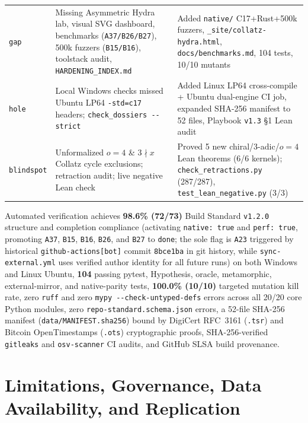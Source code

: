 \documentclass[11pt,reqno]{amsart}
\theoremstyle{plain}
\theoremstyle{definition}
\newcommand{\code}[1]{{\upshape\nolinkurl{#1}}}
\begin{document}
\begin{table}[htbp]
\begin{tabularx}{\textwidth}{@{}l>{\raggedright\arraybackslash}X>{\raggedright\arraybackslash}X@{}}
\code{gap} & Missing Asymmetric Hydra lab, visual SVG dashboard, benchmarks (\code{A37/B26/B27}), 500k fuzzers (\code{B15/B16}), toolstack audit, \code{HARDENING_INDEX.md} & Added \code{native/} C17+Rust+500k fuzzers, \code{_site/collatz-hydra.html}, \code{docs/benchmarks.md}, 104 tests, 10/10 mutants \\
\code{hole} & Local Windows checks missed Ubuntu LP64 \texttt{-std=c17} headers; \code{check_dossiers --strict} & Added Linux LP64 cross-compile + Ubuntu dual-engine CI job, expanded SHA-256 manifest to 52 files, Playbook \texttt{v1.3} \S1 Lean audit \\
\code{blindspot} & Unformalized $o=4$ \& $3\nmid x$ Collatz cycle exclusions; retraction audit; live negative Lean check & Proved 5 new chiral/3-adic/$o=4$ Lean theorems (6/6 kernels); \code{check_retractions.py} (287/287), \code{test_lean_negative.py} (3/3) \\
\bottomrule
\end{tabularx}
\end{table}

Automated verification achieves \textbf{98.6\% (72/73)} Build Standard \texttt{v1.2.0}
structure and completion compliance (activating \code{native: true} and \code{perf: true}, promoting
\code{A37}, \code{B15}, \code{B16}, \code{B26}, and \code{B27} to \code{done}; the sole flag is
\code{A23} triggered by historical \code{github-actions[bot]} commit \code{8bce1ba} in git history,
while \code{sync-external.yml} uses verified author identity for all future runs) on both Windows
and Linux Ubuntu, \textbf{104} passing pytest, Hypothesis, oracle, metamorphic, external-mirror,
and native-parity tests, \textbf{100.0\% (10/10)} targeted mutation kill rate, zero \code{ruff} and
zero \code{mypy --check-untyped-defs} errors across all 20/20 core Python modules, zero
\code{repo-standard.schema.json} errors, a 52-file SHA-256 manifest (\code{data/MANIFEST.sha256})
bound by DigiCert RFC~3161 (\code{.tsr}) and Bitcoin OpenTimestamps (\code{.ots}) cryptographic
proofs, SHA-256-verified \code{gitleaks} and \code{osv-scanner} CI audits, and GitHub SLSA build
provenance.

\section{Limitations, Governance, Data Availability, and Replication}\label{sec:governance}
\end{document}
